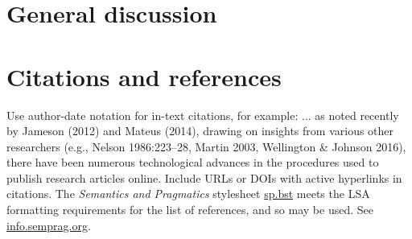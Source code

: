 \documentclass[12pt,letterpaper]{article}
\begin{document}
\section{General discussion} 
 
\section{Citations and references} Use author-date notation for in-text citations, for example: ... as noted recently by Jameson (2012) and Mateus (2014), drawing on insights from various other researchers (e.g., Nelson 1986:223–28, Martin 2003, Wellington \& Johnson 2016), there have been numerous technological advances in the procedures used to publish research articles online. Include URLs or DOIs with active hyperlinks in citations. The \textit{Semantics and Pragmatics} stylesheet \href{https://raw.githubusercontent.com/semprag/tex/master/sp.bst}{sp.bst} meets the LSA formatting requirements for the list of references, and so may be used. See \href{http://info.semprag.org}{info.semprag.org}. 
\setlength{\bibsep}{0pt plus 0.3ex}
\setlength{\bibhang}{0.3in}			%
\titleformat{\section}{\normalfont\bfseries}{\thesection}{.5em}{}		

		
\newcommand{\doi}[1]{\href{http://dx.doi.org/#1}{http://dx.doi.org/#1}}	%

\end{document}
